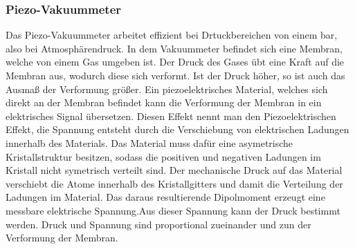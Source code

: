 \subsubsection{Piezo-Vakuummeter}
Das Piezo-Vakuummeter arbeitet effizient bei Drtuckbereichen von einem bar, also bei Atmosphärendruck.
In dem Vakuummeter befindet sich eine Membran, welche von einem Gas umgeben ist. Der Druck des Gases übt eine Kraft auf die Membran aus,
wodurch diese sich verformt. Ist der Druck höher, so ist auch das Ausmaß der Verformung größer. Ein piezoelektrisches Material, welches sich direkt
an der Membran befindet kann die Verformung der Membran in ein elektrisches Signal übersetzen. Diesen Effekt nennt man den Piezoelektrischen Effekt, 
die Spannung entsteht durch die Verschiebung von elektrischen Ladungen innerhalb des Materials. Das Material muss dafür eine asymetrische Kristallstruktur 
besitzen, sodass die positiven und negativen Ladungen im Kristall nicht symetrisch verteilt sind. Der mechanische Druck auf das Material verschiebt die 
Atome innerhalb des Kristallgitters und damit die Verteilung der Ladungen im Material. Das daraus resultierende Dipolmoment erzeugt eine messbare elektrische
Spannung.Aus dieser Spannung kann der Druck bestimmt werden. Druck und Spannung sind proportional zueinander und zun der Verformung der Membran. 




\cite{sample}
